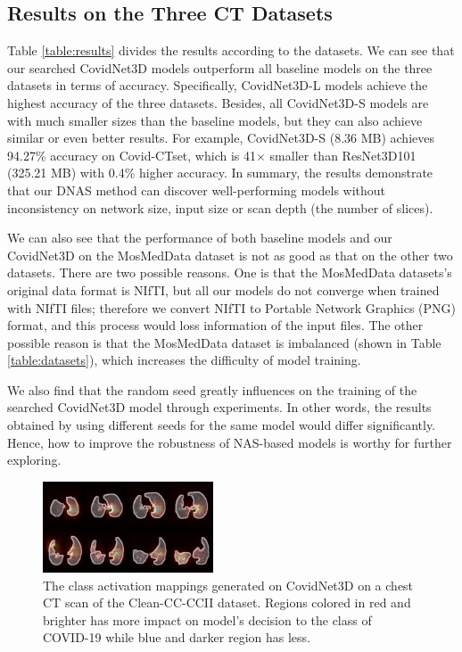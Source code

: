 \documentclass[letterpaper]{article}
\begin{document}

\subsection{Results on the Three CT Datasets}

Table \ref{table:results} divides the results according to the datasets. We can see that our searched CovidNet3D models outperform all baseline models on the three datasets in terms of accuracy. Specifically, CovidNet3D-L models achieve the highest accuracy of the three datasets. Besides, all CovidNet3D-S models are with much smaller sizes than the baseline models, but they can also achieve similar or even better results. For example, CovidNet3D-S (8.36 MB) achieves 94.27\% accuracy on Covid-CTset, which is 41$\times$ smaller than ResNet3D101 (325.21 MB) with 0.4\% higher accuracy. In summary, the results demonstrate that our DNAS method can discover well-performing models without inconsistency on network size, input size or scan depth (the number of slices).

We can also see that the performance of both baseline models and our CovidNet3D on the MosMedData dataset is not as good as that on the other two datasets. There are two possible reasons. One is that the MosMedData datasets's original data format is NIfTI, but all our models do not converge when trained with NIfTI files; therefore we convert NIfTI to Portable Network Graphics (PNG) format, and this process would loss information of the input files. The other possible reason is that the MosMedData dataset is imbalanced (shown in Table \ref{table:datasets}), which increases the difficulty of model training.

We also find that the random seed greatly influences on the training of the searched CovidNet3D model through experiments. In other words, the results obtained by using different seeds for the same model would differ significantly. Hence, how to improve the robustness of NAS-based models is worthy for further exploring.


\begin{figure}[!ht]
    \centering
    \includegraphics[width=0.45\textwidth]{images/heatmap.png}
    \caption{The class activation mappings generated on CovidNet3D on a chest CT scan of the Clean-CC-CCII dataset. Regions colored in red and brighter has more impact on model's decision to the class of COVID-19 while blue and darker region has less.}
    \label{fig:cam}
\end{figure}
\end{document}
